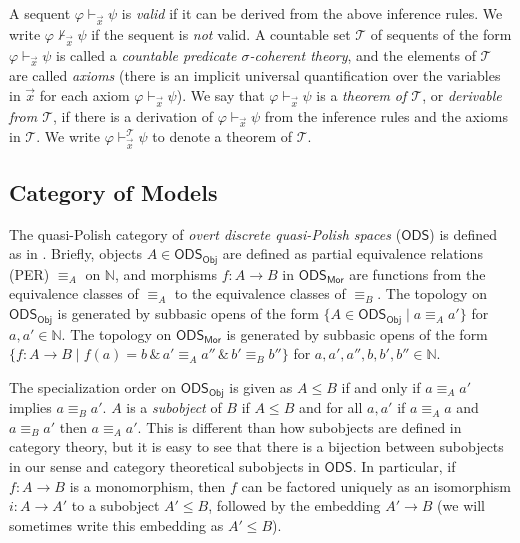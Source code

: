 \documentclass{article}
\theoremstyle{plain}
\def\cal#1{{\mathcal #1}}
\def\IN{{\mathbb N}}
\def\calT{{\cal T}}
\newcommand{\ODS}{{\mathsf{ODS}}}
\newcommand{\Mor}{\mathsf{Mor}}
\newcommand{\Obj}{\mathsf{Obj}}
\begin{document}
A sequent $\varphi \vdash_{\vec{x}}\psi$ is \emph{valid} if it can be derived from the above inference rules. We write $\varphi \not\vdash_{\vec{x}}\psi$ if the sequent is \emph{not} valid. A countable set $\calT$ of sequents of the form $\varphi\vdash_{\vec{x}} \psi$ is called a \emph{countable predicate $\sigma$-coherent theory}, and the elements of $\calT$ are called \emph{axioms}  (there is an implicit universal quantification over the variables in $\vec{x}$ for each axiom $\varphi \vdash_{\vec{x}} \psi$). We say that $\varphi\vdash_{\vec{x}} \psi$ is a \emph{theorem of $\calT$}, or \emph{derivable from $\calT$}, if there is a derivation of $\varphi\vdash_{\vec{x}} \psi$ from the inference rules and the axioms in $\calT$. We write $\varphi\vdash_{\vec{x}}^{\calT} \psi$ to denote a theorem of $\calT$.


\subsection{Category of Models}\label{subsec_CatOfMods}

The quasi-Polish category of \emph{overt discrete quasi-Polish spaces} ($\ODS$) is defined as in \cite{dbr26}. Briefly, objects $A\in \ODS_\Obj$ are defined as partial equivalence relations (PER) $\equiv_A$ on $\IN$, and morphisms $f\colon A\to B$ in $\ODS_\Mor$ are functions from the equivalence classes of $\equiv_A$ to the equivalence classes of $\equiv_B$. The topology on $\ODS_\Obj$ is generated by subbasic opens of the form $\{ A \in\ODS_\Obj \mid a \equiv_A a'\}$ for $a,a'\in\IN$. The topology on $\ODS_\Mor$ is generated by subbasic opens of the form $\{ f\colon A\to B \mid f(a)=b \,\&\, a' \equiv_A a'' \,\&\, b' \equiv_B b'' \}$ for $a,a',a'', b, b', b'' \in\IN$.

The specialization order on $\ODS_\Obj$ is given as $A \leq B$ if and only if $a \equiv_A a'$ implies $a \equiv_B a'$. $A$ is a \emph{subobject} of $B$ if $A \leq B$ and for all $a,a'$ if $a \equiv_A a$ and $a \equiv_B a'$ then $a \equiv_A a'$. This is different than how subobjects are defined in category theory, but it is easy to see that there is a bijection between subobjects in our sense and category theoretical subobjects in $\ODS$. In particular, if $f\colon A \to B$ is a monomorphism, then $f$ can be factored uniquely as an isomorphism $i\colon A \to A'$ to a subobject $A' \leq B$, followed by the embedding $A' \to B$ (we will sometimes write this embedding as $A' \leq B$).
\end{document}
